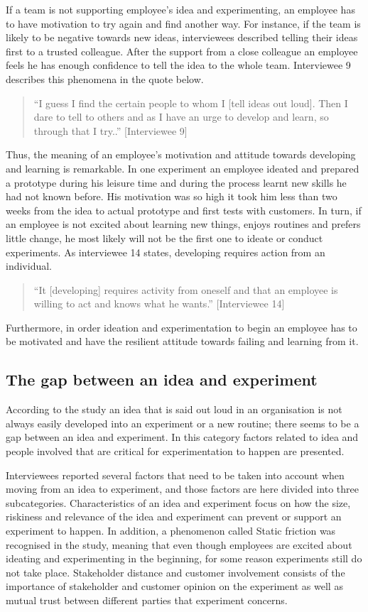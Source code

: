 If a team is not supporting employee's idea and experimenting, an employee has to have motivation to try again and find another way. For instance, if the team is likely to be negative towards new ideas, interviewees described telling their ideas first to a trusted colleague. After the support from a close colleague an employee feels he has enough confidence to tell the idea to the whole team. Interviewee 9 describes this phenomena in the quote below. 
\begin{quote}
``I guess I find the certain people to whom I [tell ideas out loud]. Then I dare to tell to others and as I have an urge to develop and learn, so through that I try..'' [Interviewee 9]
\end{quote}
Thus, the meaning of an employee's motivation and attitude towards developing and learning is remarkable. In one experiment an employee ideated and prepared a prototype during his leisure time and during the process learnt new skills he had not known before. His motivation was so high it took him less than two weeks from the idea to actual prototype and first tests with customers. In turn, if an employee is not excited about learning new things, enjoys routines and prefers little change, he most likely will not be the first one to ideate or conduct experiments. As interviewee 14 states, developing requires action from an individual. 
\begin{quote}
 ``It [developing] requires activity from oneself and that an employee is willing to act and knows what he wants.'' [Interviewee 14]
\end{quote}
Furthermore, in order ideation and experimentation to begin an employee has to be motivated and have the resilient attitude towards failing and learning from it. 

\subsection{The gap between an idea and experiment}
According to the study an idea that is said out loud in an organisation is not always easily developed into an experiment or a new routine; there seems to be a gap between an idea and experiment.  In this category factors related to idea and people involved that are critical for experimentation to happen are presented.

Interviewees reported several factors that need to be taken into account when moving from an idea to experiment, and those factors are here divided into three subcategories. Characteristics of an idea and experiment focus on how the size, riskiness and relevance of the idea and experiment can prevent or support an experiment to happen. In addition, a phenomenon called Static friction was recognised in the study, meaning that even though employees are excited about ideating and experimenting in the beginning, for some reason experiments still do not take place. Stakeholder distance and customer involvement consists of the importance of stakeholder and customer opinion on the experiment as well as mutual trust between different parties that experiment concerns. 

